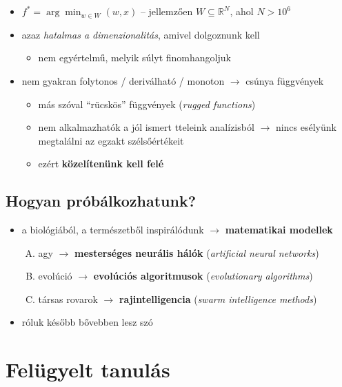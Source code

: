\documentclass[a4paper, 11pt]{article}
\begin{document}
\begin{itemize}
	\item $\boxed{f^* = \arg \min_{w \in W}^{~} (w, x)}$ -- jellemzően $W \subseteq \mathbb{R}^N$, ahol $N > 10^6$
	\item azaz \textit{hatalmas a dimenzionalitás}, amivel dolgoznunk kell
	\begin{itemize}
		\item nem egyértelmű, melyik súlyt finomhangoljuk
	\end{itemize}
	\item nem gyakran folytonos / deriválható / monoton $\to$ csúnya függvények
	\begin{itemize}
		\item más szóval ``rücskös'' függvények (\textit{rugged functions})
		\item nem alkalmazhatók a jól ismert tteleink analízisból $\to$ nincs esélyünk megtalálni az egzakt szélsőértékeit
		\item ezért \textbf{közelítenünk kell felé}
	\end{itemize}
\end{itemize}

\subsection{Hogyan próbálkozhatunk?}

\begin{itemize}
	\item a biológiából, a természetből inspirálódunk $\to$ \textbf{matematikai modellek}
	\begin{enumerate}[A)]
		\item agy $\to$ \textbf{mesterséges neurális hálók} (\textit{artificial neural networks})
		\item evolúció $\to$ \textbf{evolúciós algoritmusok} (\textit{evolutionary algorithms})
		\item társas rovarok $\to$ \textbf{rajintelligencia} (\textit{swarm intelligence methods})
	\end{enumerate}
	\item róluk később bővebben lesz szó
\end{itemize}

\newpage

\section{Felügyelt tanulás}
\end{document}
